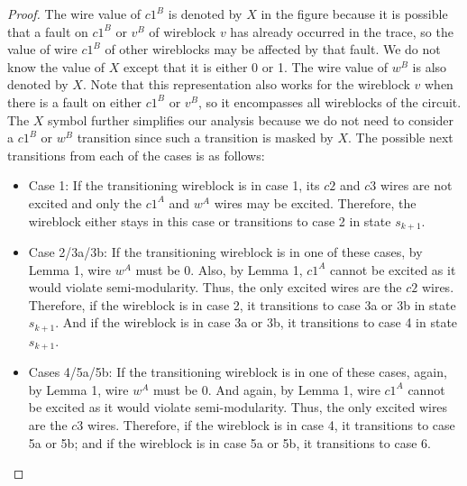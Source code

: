\documentclass[12pt]{report}
\begin{document}
\begin{proof}
The wire value of $c1^B$ is denoted by $X$ in the figure because it is possible that a fault on $c1^B$ or $v^B$ of wireblock $v$ has already occurred in the trace, so the value of wire $c1^B$ of other wireblocks may be affected by that fault. We do not know the value of $X$ except that it is either 0 or 1.  The wire value of $w^B$ is also denoted by $X$. Note that this representation also works for the wireblock $v$ when there is a fault on either $c1^B$ or $v^B$, so it encompasses all wireblocks of the circuit.  
The $X$ symbol further simplifies our analysis because we do not need to consider a $c1^B$ or $w^B$ transition since such a transition is masked by $X$.  %
The possible next transitions from each of the cases is as follows:
\begin{itemize}
\item
Case 1: If the transitioning wireblock is in case 1, its $c2$ and $c3$ wires are not excited and only the $c1^A$ and $w^A$ wires may be excited. Therefore, the wireblock either stays in this case or transitions to case 2 in state $s_{k+1}$. %
\item
Case 2/3a/3b: If the transitioning wireblock is in one of these cases, by Lemma 1, wire $w^A$ must be 0. Also, by Lemma 1, $c1^A$ cannot be excited as it would violate semi-modularity. Thus, the only excited wires are the $c2$ wires. 
Therefore, if the wireblock is in case 2, it transitions to case 3a or 3b in state $s_{k+1}$. And if the wireblock is in case 3a or 3b, it transitions to case 4 in state $s_{k+1}$.
\item
Cases 4/5a/5b: If the transitioning wireblock is in one of these cases, again, by Lemma 1, wire $w^A$ must be 0. And again, by Lemma 1, wire $c1^A$ cannot be excited as it would violate semi-modularity. Thus, the only excited wires are the $c3$ wires. Therefore, if the wireblock is in case 4, it transitions to case 5a or 5b; and if the wireblock is in case 5a or 5b, it transitions to case 6.

\end{itemize}
\end{proof}
\end{document}
